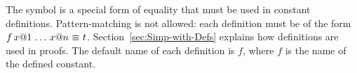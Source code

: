 \begin{isabellebody}
\begin{isamarkuptext}%
\noindent%
The symbol  is a special form of equality
that must be used in constant definitions.
Pattern-matching is not allowed: each definition must be of
the form $f\,x@1\,\dots\,x@n~\emph{$\equiv$}~t$.
Section~\ref{sec:Simp-with-Defs} explains how definitions are used
in proofs. The default name of each definition is $f$, where
$f$ is the name of the defined constant.%
\end{isamarkuptext}%
\isamarkuptrue%
%
\isadelimtheory
%
\endisadelimtheory
%
\isatagtheory
%
\endisatagtheory
{\isafoldtheory}%
%
\isadelimtheory
%
\endisadelimtheory
\end{isabellebody}%
